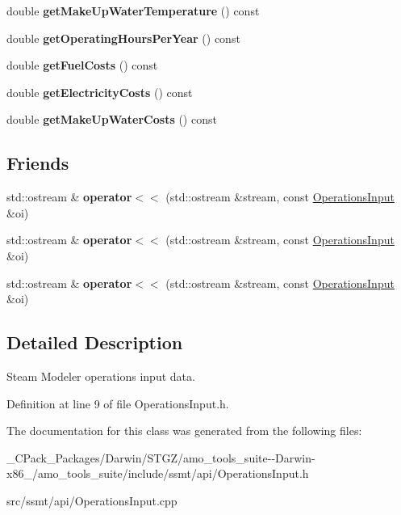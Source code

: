 \begin{DoxyCompactItemize}
double {\bfseries get\+Make\+Up\+Water\+Temperature} () const
\item 
\mbox{\label{class_operations_input_a31e46749b9d8cad72bd13ee647863b0f}} 
double {\bfseries get\+Operating\+Hours\+Per\+Year} () const
\item 
\mbox{\label{class_operations_input_a7d73c641f00eefc18c10cf3dd79299ef}} 
double {\bfseries get\+Fuel\+Costs} () const
\item 
\mbox{\label{class_operations_input_a9e52d266627b127cbc8ff4d00f5d379b}} 
double {\bfseries get\+Electricity\+Costs} () const
\item 
\mbox{\label{class_operations_input_a32694bb1719f4cb889c14ec61fac914f}} 
double {\bfseries get\+Make\+Up\+Water\+Costs} () const
\end{DoxyCompactItemize}
\subsection*{Friends}
\begin{DoxyCompactItemize}
\item 
\mbox{\label{class_operations_input_a4c7687ca840cbbbef10185887cfcf1f1}} 
std\+::ostream \& {\bfseries operator$<$$<$} (std\+::ostream \&stream, const \hyperlink{class_operations_input}{Operations\+Input} \&oi)
\item 
\mbox{\label{class_operations_input_a4c7687ca840cbbbef10185887cfcf1f1}} 
std\+::ostream \& {\bfseries operator$<$$<$} (std\+::ostream \&stream, const \hyperlink{class_operations_input}{Operations\+Input} \&oi)
\item 
\mbox{\label{class_operations_input_a4c7687ca840cbbbef10185887cfcf1f1}} 
std\+::ostream \& {\bfseries operator$<$$<$} (std\+::ostream \&stream, const \hyperlink{class_operations_input}{Operations\+Input} \&oi)
\end{DoxyCompactItemize}


\subsection{Detailed Description}
Steam Modeler operations input data. 

Definition at line 9 of file Operations\+Input.\+h.



The documentation for this class was generated from the following files\+:\begin{DoxyCompactItemize}
\item 
\+\_\+\+C\+Pack\+\_\+\+Packages/\+Darwin/\+S\+T\+G\+Z/amo\+\_\+tools\+\_\+suite-\/-\/\+Darwin-\/x86\+\_/amo\+\_\+tools\+\_\+suite/include/ssmt/api/Operations\+Input.\+h\item 
src/ssmt/api/Operations\+Input.\+cpp\end{DoxyCompactItemize}
